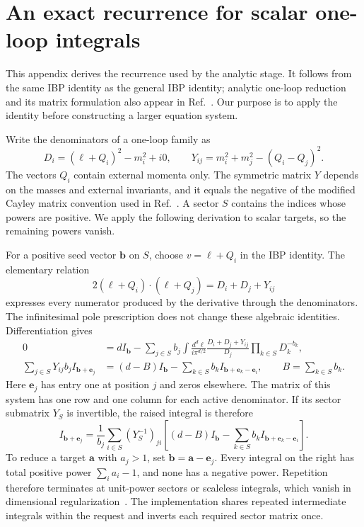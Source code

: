 \section{An exact recurrence for scalar one-loop integrals}
\label{app:notes-analytic-decomposition}
This appendix derives the recurrence used by the analytic stage. It follows from the same IBP identity as the general IBP identity; analytic one-loop reduction and its matrix formulation also appear in Ref.~\cite{Hu2025}. Our purpose is to apply the identity before constructing a larger equation system.

Write the denominators of a one-loop family as
\begin{equation}
 D_i=(\ell+Q_i)^2-m_i^2+i0,\qquad
 Y_{ij}=m_i^2+m_j^2-(Q_i-Q_j)^2.
 \label{eq:notes-analytic-y}
\end{equation}
The vectors $Q_i$ contain external momenta only. The symmetric matrix $Y$ depends on the masses and external invariants, and it equals the negative of the modified Cayley matrix convention used in Ref.~\cite{Hu2025}. A sector $S$ contains the indices whose powers are positive. We apply the following derivation to scalar targets, so the remaining powers vanish.

For a positive seed vector $\boldsymbol b$ on $S$, choose $v=\ell+Q_i$ in the IBP identity. The elementary relation
\begin{equation}
 2(\ell+Q_i)\cdot(\ell+Q_j)=D_i+D_j+Y_{ij}
 \label{eq:notes-analytic-dot}
\end{equation}
expresses every numerator produced by the derivative through the denominators. The infinitesimal pole prescription does not change these algebraic identities. Differentiation gives
\begin{align}
0&=d I_{\boldsymbol b}
 -\sum_{j\in S}b_j\int\frac{d^d\ell}{i\pi^{d/2}}
 \frac{D_i+D_j+Y_{ij}}{D_j}\prod_{k\in S}D_k^{-b_k},\\
\sum_{j\in S}Y_{ij}b_j I_{\boldsymbol b+\boldsymbol e_j}
 &= (d-B)I_{\boldsymbol b}
 -\sum_{k\in S}b_k I_{\boldsymbol b+\boldsymbol e_k-\boldsymbol e_i},
 \qquad B=\sum_{k\in S}b_k.
 \label{eq:notes-analytic-system}
\end{align}
Here $\boldsymbol e_j$ has entry one at position $j$ and zeros elsewhere. The matrix of this system has one row and one column for each active denominator. If its sector submatrix $Y_S$ is invertible, the raised integral is therefore
\begin{equation}
 I_{\boldsymbol b+\boldsymbol e_j}
 =\frac{1}{b_j}\sum_{i\in S}(Y_S^{-1})_{ji}
 \left[(d-B)I_{\boldsymbol b}
 -\sum_{k\in S}b_k I_{\boldsymbol b+\boldsymbol e_k-\boldsymbol e_i}\right].
 \label{eq:notes-analytic-recurrence}
\end{equation}
To reduce a target $\boldsymbol a$ with $a_j>1$, set $\boldsymbol b=\boldsymbol a-\boldsymbol e_j$. Every integral on the right has total positive power $\sum_i a_i-1$, and none has a negative power. Repetition therefore terminates at unit-power sectors or scaleless integrals, which vanish in dimensional regularization~\cite{Weinzierl2022}. The implementation shares repeated intermediate integrals within the request and inverts each required sector matrix once.

